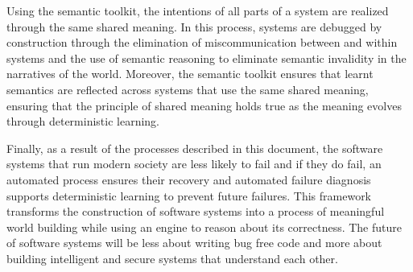 Using the semantic toolkit, the intentions of all parts of a system are realized through the same shared meaning. In this process, systems are debugged by construction through the elimination of miscommunication between and within systems and the use of semantic reasoning to eliminate semantic invalidity in the narratives of the world. Moreover, the semantic toolkit ensures that learnt semantics are reflected across systems that use the same shared meaning, ensuring that the principle of shared meaning holds true as the meaning evolves through deterministic learning.

Finally, as a result of the processes described in this document, the software systems that run modern society are less likely to fail and if they do fail, an automated process ensures their recovery and automated failure diagnosis supports deterministic learning to prevent future failures. This framework transforms the construction of software systems into a process of meaningful world building while using an engine to reason about its correctness. The future of software systems will be less about writing bug free code and more about building intelligent and secure systems that understand each other. 